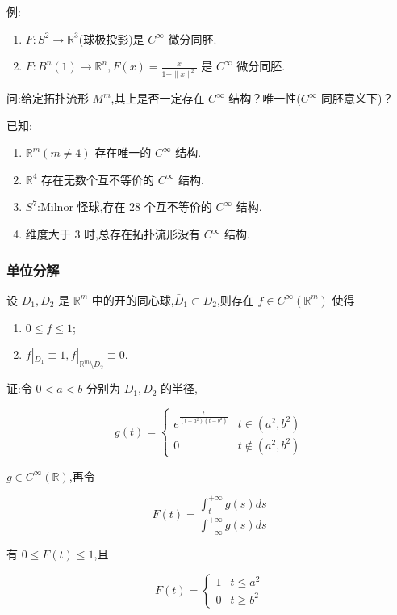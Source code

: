 例:
\begin{enumerate}
    \item $F : S^2 \to \mathbb{R}^3$(球极投影)是 $C^\infty$ 微分同胚.
    \item $F : B^n(1) \to \mathbb{R}^n, F(x) = \frac{x}{1 - \|x\|^2}$ 是 $C^\infty$ 微分同胚.
\end{enumerate}

问:给定拓扑流形 $M^m$,其上是否一定存在 $C^\infty$ 结构？唯一性($C^\infty$ 同胚意义下)？

已知:
\begin{enumerate}
    \item $\mathbb{R}^m(m \neq 4)$ 存在唯一的 $C^\infty$ 结构.
    \item $\mathbb{R}^4$ 存在无数个互不等价的 $C^\infty$ 结构.
    \item $S^7$:Milnor 怪球,存在 28 个互不等价的 $C^\infty$ 结构.
    \item 维度大于 3 时,总存在拓扑流形没有 $C^\infty$ 结构.
\end{enumerate}

\subsubsection{单位分解}

\begin{lemma}[引理1]
设 $D_1, D_2$ 是 $\mathbb{R}^m$ 中的开的同心球,$\bar{D}_1 \subset D_2$,则存在 $f \in C^\infty(\mathbb{R}^m)$ 使得
\begin{enumerate}
    \item $0 \leq f \leq 1$;
    \item $f|_{D_1} \equiv 1, f|_{\mathbb{R}^m \setminus D_2} \equiv 0$.
\end{enumerate}
\end{lemma}

证:令 $0 < a < b$ 分别为 $D_1, D_2$ 的半径,

\[
g(t) = 
\begin{cases}
e^{\frac{t}{(t-a^2)(t-b^2)}} & t \in (a^2, b^2)\\
0 & t \notin (a^2, b^2)
\end{cases}
\]

$g \in C^\infty(\mathbb{R})$,再令

\[
F(t) = \frac{\int_{t}^{+\infty} g(s) ds}{\int_{-\infty}^{+\infty} g(s) ds}
\]

有 $0 \leq F(t) \leq 1$,且

\[
F(t) = 
\begin{cases} 
1 & t \leq a^2 \\ 
0 & t \geq b^2 
\end{cases}
\]

